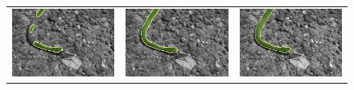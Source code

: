 \documentclass[smallextended]{svjour3}       %
\begin{document}
{{\begin{figure}[ht!]
\begin{tabular}{ccc}
		\includegraphics[scale=0.2]{images/segmentation/bc/snake/gc-seg.png} &
		\includegraphics[scale=0.2]{images/segmentation/bc/snake/corrected-seg.png} &
		\includegraphics[scale=0.2]{images/segmentation/schoenemann/snake/snake-seg.png}\\						

\end{tabular}
\end{figure}}}
\end{document}
